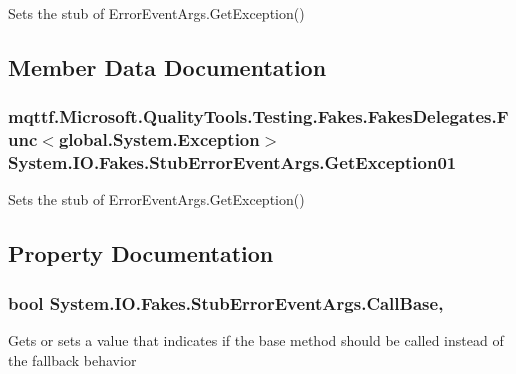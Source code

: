 Sets the stub of Error\-Event\-Args.\-Get\-Exception()



\subsection{Member Data Documentation}
\hypertarget{class_system_1_1_i_o_1_1_fakes_1_1_stub_error_event_args_af5160f26a54a539e3e3a8c2e3a5c7bac}{
\subsubsection[{Get\-Exception01}]{\setlength{\rightskip}{0pt plus 5cm}mqttf.\-Microsoft.\-Quality\-Tools.\-Testing.\-Fakes.\-Fakes\-Delegates.\-Func$<$global.\-System.\-Exception$>$ System.\-I\-O.\-Fakes.\-Stub\-Error\-Event\-Args.\-Get\-Exception01}}\label{class_system_1_1_i_o_1_1_fakes_1_1_stub_error_event_args_af5160f26a54a539e3e3a8c2e3a5c7bac}


Sets the stub of Error\-Event\-Args.\-Get\-Exception()



\subsection{Property Documentation}
\hypertarget{class_system_1_1_i_o_1_1_fakes_1_1_stub_error_event_args_a805b5644284b21c3e82295740c538afe}{
\subsubsection[{Call\-Base}]{\setlength{\rightskip}{0pt plus 5cm}bool System.\-I\-O.\-Fakes.\-Stub\-Error\-Event\-Args.\-Call\-Base\hspace{0.3cm}{\ttfamily [get]}, {\ttfamily [set]}}}\label{class_system_1_1_i_o_1_1_fakes_1_1_stub_error_event_args_a805b5644284b21c3e82295740c538afe}


Gets or sets a value that indicates if the base method should be called instead of the fallback behavior

